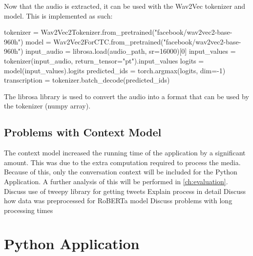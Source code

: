 Now that the audio is extracted, it can be used with the Wav2Vec tokenizer and model. This is implemented as such:
\begin{algorithm}
    \begin{algorithmic}
        \STATE tokenizer = Wav2Vec2Tokenizer.from\_pretrained("facebook/wav2vec2-base-960h")
        \STATE model = Wav2Vec2ForCTC.from\_pretrained("facebook/wav2vec2-base-960h")
        \STATE input\_audio = librosa.load(audio\_path, sr=16000)[0]
        \STATE input\_values = tokenizer(input\_audio, return\_tensor="pt").input\_values
        \STATE logits = model(input\_values).logits
        \STATE predicted\_ids = torch.argmax(logits, dim=-1)
        \STATE transcription = tokenizer.batch\_decode(predicted\_ids)
    \end{algorithmic}
\end{algorithm}

The librosa library is used to convert the audio into a format that can be used by the tokenizer (numpy array).
\subsection{Problems with Context Model}
The context model increased the running time of the application by a significant amount. This was due to the extra computation required to process the media.
Because of this, only the conversation context will be included for the Python Application. A further analysis of this will be performed in \cref{ch:evaluation}.
Discuss use of tweepy library for getting tweets
Explain process in detail
Discuss how data was preprocessed for RoBERTa model
Discuss problems with long processing times
\section{Python Application}
